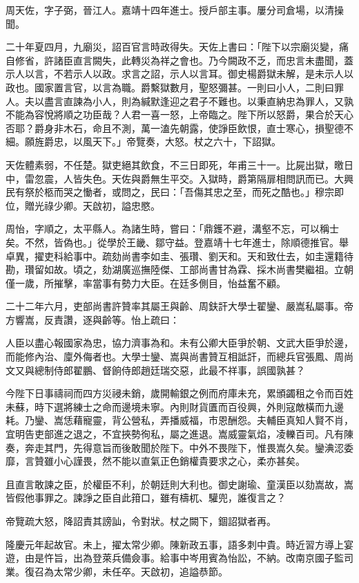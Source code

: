 \begin{pinyinscope}
{{周天佐，字子弼，晉江人。嘉靖十四年進士。授戶部主事。屢分司倉場，以清操聞。

二十年夏四月，九廟災，詔百官言時政得失。天佐上書曰：「陛下以宗廟災變，痛自修省，許諸臣直言闕失，此轉災為祥之會也。乃今闕政不乏，而忠言未盡聞，蓋示人以言，不若示人以政。求言之詔，示人以言耳。御史楊爵獄未解，是未示人以政也。國家置言官，以言為職。爵繫獄數月，聖怒彌甚。一則曰小人，二則曰罪人。夫以盡言直諫為小人，則為緘默逢迎之君子不難也。以秉直納忠為罪人，又孰不能為容悅將順之功臣哉？人君一喜一怒，上帝臨之。陛下所以怒爵，果合於天心否耶？爵身非木石，命且不測，萬一溘先朝露，使諍臣飲恨，直士寒心，損聖德不細。願旌爵忠，以風天下。」帝覽奏，大怒。杖之六十，下詔獄。

天佐體素弱，不任楚。獄吏絕其飲食，不三日即死，年甫三十一。比屍出獄，曒日中，雷忽震，人皆失色。天佐與爵無生平交。入獄時，爵第隔扉相問訊而已。大興民有祭於柩而哭之慟者，或問之，民曰：「吾傷其忠之至，而死之酷也。」穆宗即位，贈光祿少卿。天啟初，謚忠愍。

周怡，字順之，太平縣人。為諸生時，嘗曰：「鼎鑊不避，溝壑不忘，可以稱士矣。不然，皆偽也。」從學於王畿、鄒守益。登嘉靖十七年進士，除順德推官。舉卓異，擢吏科給事中。疏劾尚書李如圭、張瓚、劉天和。天和致仕去，如圭還籍待勘，瓚留如故。頃之，劾湖廣巡撫陸傑、工部尚書甘為霖、採木尚書樊繼祖。立朝僅一歲，所摧擊，率當事有勢力大臣。在廷多側目，怡益奮不顧。

二十二年六月，吏部尚書許贊率其屬王與齡、周鈇訐大學士翟鑾、嚴嵩私屬事。帝方響嵩，反責讚，逐與齡等。怡上疏曰：

人臣以盡心報國家為忠，協力濟事為和。未有公卿大臣爭於朝、文武大臣爭於邊，而能修內治、廩外侮者也。大學士鑾、嵩與尚書贊互相詆訐，而總兵官張鳳、周尚文又與總制侍郎翟鵬、督餉侍郎趙廷瑞交惡，此最不祥事，誤國孰甚？

今陛下日事禱祠而四方災祲未銷，歲開輸銀之例而府庫未充，累頒蠲租之令而百姓未蘇，時下選將練士之命而邊境未寧。內則財貨匱而百役興，外則寇敵橫而九邊耗。乃鑾、嵩恁藉寵靈，背公營私，弄播威福，市恩酬怨。夫輔臣真知人賢不肖，宜明告吏部進之退之，不宜挾勢徇私，屬之進退。嵩威靈氣焰，凌轢百司。凡有陳奏，奔走其門，先得意旨而後敢聞於陛下。中外不畏陛下，惟畏嵩久矣。鑾淟涊委靡，言贊雖小心謹畏，然不能以直氣正色銷權貴要求之心，柔亦甚矣。

且直言敢諫之臣，於權臣不利，於朝廷則大利也。御史謝瑜、童漢臣以劾嵩故，嵩皆假他事罪之。諫諍之臣自此箝口，雖有檮杌、驩兜，誰復言之？

帝覽疏大怒，降詔責其謗訕，令對狀。杖之闕下，錮詔獄者再。

隆慶元年起故官。未上，擢太常少卿。陳新政五事，語多刺中貴。時近習方導上宴遊，由是忤旨，出為登萊兵備僉事。給事中岑用賓為怡訟，不納。改南京國子監司業。復召為太常少卿，未任卒。天啟初，追謚恭節。

}}
\end{pinyinscope}
